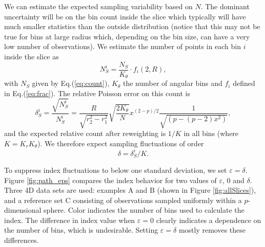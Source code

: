 \documentclass[]{interact}
\theoremstyle{plain}%
\theoremstyle{definition}
\theoremstyle{remark}
\begin{document}
We can estimate the expected sampling variability based on \(N\). The
dominant uncertainty will be on the bin count inside the slice which
typically will have much smaller statistics than the outside
distribution (notice that this may not be true for bins at large radius
which, depending on the bin size, can have a very low number of
observations). We estimate the number of points in each bin \(i\) inside
the slice as \begin{equation}
N_S^i = \frac{N_S}{K_{\theta}} \cdot f_i(2, R),
\end{equation} with \(N_S\) given by Eq.(\ref{eq:count}), \(K_{\theta}\)
the number of angular bins and \(f_i\) defined in Eq.(\ref{eq:frac}).
The relative Poisson error on this count is \begin{equation}
\delta_S^i = \frac{\sqrt{N_S^i}}{N_S^i} = 
\frac{R}{\sqrt{r_2^2 - r_1^2}} \sqrt{\frac{2 K_{\theta}}{N}} x^{(2-p)/2}
\frac{1}{\sqrt{\left(p - (p-2) x^{2}\right)}}, 
\end{equation} and the expected relative count after reweighting is
\(1/K\) in all bins (where \(K=K_r K_{\theta}\)). We therefore expect
sampling fluctuations of order \begin{equation}
\delta = \delta_S^i / K. 
\label{eq:eps}
\end{equation}

To suppress index fluctuations to below one standard deviation, we set
\(\varepsilon = \delta\). Figure \ref{fig:path_eps} compares the index
behavior for two values of \(\varepsilon\), \(0\) and \(\delta\). Three
4D data sets are used: examples A and B (shown in Figure
\ref{fig:allSlices}), and a reference set C consisting of observations
sampled uniformly within a \(p\)-dimensional sphere. Color indicates the
number of bins used to calculate the index. The difference in index
value when \(\varepsilon=0\) clearly indicates a dependence on the
number of bins, which is undesirable. Setting \(\varepsilon = \delta\)
mostly removes these differences.
\end{document}
